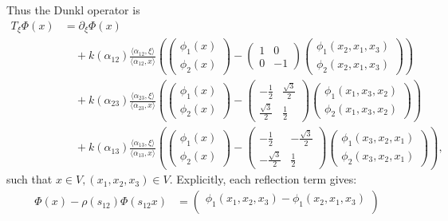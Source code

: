 \documentclass[12pt]{article}
\newcommand{\1}{\mathbbm{1}}
\theoremstyle{definition}
\begin{document}
\begin{itemize}
Thus the Dunkl operator is
\[
\begin{aligned}
T_\xi \Phi(x) &= \partial_\xi \Phi(x) \\[6pt]
&\quad+ k(\alpha_{12}) \frac{\langle \alpha_{12},\xi\rangle}{\langle \alpha_{12},x\rangle}
\left(
\begin{pmatrix}\phi_1(x) \\ \phi_2(x)\end{pmatrix}
-
\begin{pmatrix}1&0\\0&-1\end{pmatrix}
\begin{pmatrix}\phi_1(x_2,x_1,x_3) \\ \phi_2(x_2,x_1,x_3)\end{pmatrix}
\right) \\[12pt]
&\quad+ k(\alpha_{23}) \frac{\langle \alpha_{23},\xi\rangle}{\langle \alpha_{23},x\rangle}
\left(
\begin{pmatrix}\phi_1(x) \\ \phi_2(x)\end{pmatrix}
-
\begin{pmatrix}-\tfrac{1}{2}&\tfrac{\sqrt{3}}{2}\\[6pt]\tfrac{\sqrt{3}}{2}&\tfrac{1}{2}\end{pmatrix}
\begin{pmatrix}\phi_1(x_1,x_3,x_2) \\ \phi_2(x_1,x_3,x_2)\end{pmatrix}
\right) \\[12pt]
&\quad+ k(\alpha_{13}) \frac{\langle \alpha_{13},\xi\rangle}{\langle \alpha_{13},x\rangle}
\left(
\begin{pmatrix}\phi_1(x) \\ \phi_2(x)\end{pmatrix}
-
\begin{pmatrix}-\tfrac{1}{2}&-\tfrac{\sqrt{3}}{2}\\[6pt]-\tfrac{\sqrt{3}}{2}&\tfrac{1}{2}\end{pmatrix}
\begin{pmatrix}\phi_1(x_3,x_2,x_1) \\ \phi_2(x_3,x_2,x_1)\end{pmatrix}
\right), 
\end{aligned}
\]
such that $x\in V, (x_1,x_2,x_3)\in V.$
Explicitly, each reflection term gives:
\[
\begin{aligned}
\Phi(x) - \rho(s_{12})\Phi(s_{12}x)
&=
\begin{pmatrix}
\phi_1(x_1,x_2,x_3) - \phi_1(x_2,x_1,x_3) \\[4pt]

\end{pmatrix}
\end{aligned}\]
\end{itemize}
\end{document}
